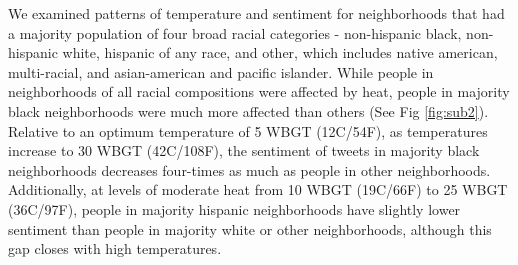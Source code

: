 \documentclass{article}
\begin{document}
We examined patterns of temperature and sentiment for neighborhoods that had a majority population of four broad racial categories - non-hispanic black, non-hispanic white, hispanic of any race, and other, which includes native american, multi-racial, and asian-american and pacific islander.  While people in neighborhoods of all racial compositions were affected by heat, people in majority black neighborhoods were much more affected than others  (See Fig \ref{fig:sub2}).  Relative to an optimum temperature of 5 WBGT (12C/54F), as temperatures increase to 30 WBGT (42C/108F), the sentiment of tweets in majority black neighborhoods decreases four-times as much as people in other neighborhoods.  Additionally, at levels of moderate heat from 10 WBGT (19C/66F) to 25 WBGT (36C/97F), people in majority hispanic neighborhoods have slightly lower sentiment than people in majority white or other neighborhoods, although this gap closes with high temperatures.
\end{document}
